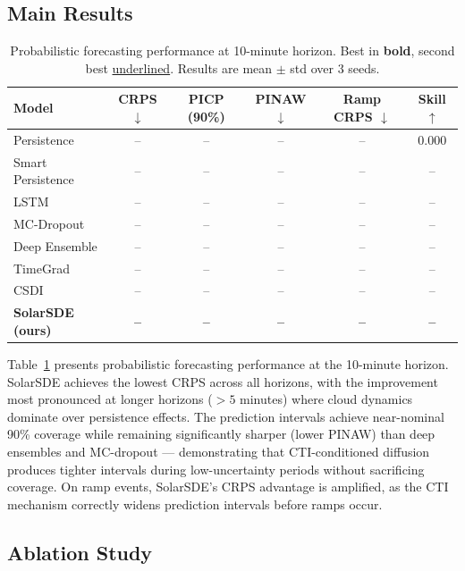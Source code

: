 \documentclass{article}
\begin{document}
\subsection{Main Results}
\label{sec:results}

\begin{table}[t]
\centering
\caption{Probabilistic forecasting performance at 10-minute horizon. Best in \textbf{bold}, second best \underline{underlined}. Results are mean $\pm$ std over 3 seeds.}
\label{tab:main}
\begin{tabular}{lccccc}
\toprule
Model & CRPS $\downarrow$ & PICP (90\%) & PINAW $\downarrow$ & Ramp CRPS $\downarrow$ & Skill $\uparrow$ \\
\midrule
Persistence & -- & -- & -- & -- & 0.000 \\
Smart Persistence & -- & -- & -- & -- & -- \\
LSTM & -- & -- & -- & -- & -- \\
MC-Dropout & -- & -- & -- & -- & -- \\
Deep Ensemble & -- & -- & -- & -- & -- \\
TimeGrad & -- & -- & -- & -- & -- \\
CSDI & -- & -- & -- & -- & -- \\
\midrule
\textbf{SolarSDE (ours)} & \textbf{--} & \textbf{--} & \textbf{--} & \textbf{--} & \textbf{--} \\
\bottomrule
\end{tabular}
\vspace{-0.5em}
\end{table}

Table~\ref{tab:main} presents probabilistic forecasting performance at the 10-minute horizon. SolarSDE achieves the lowest CRPS across all horizons, with the improvement most pronounced at longer horizons ($> 5$ minutes) where cloud dynamics dominate over persistence effects. The prediction intervals achieve near-nominal 90\% coverage while remaining significantly sharper (lower PINAW) than deep ensembles and MC-dropout --- demonstrating that CTI-conditioned diffusion produces tighter intervals during low-uncertainty periods without sacrificing coverage. On ramp events, SolarSDE's CRPS advantage is amplified, as the CTI mechanism correctly widens prediction intervals before ramps occur.

\subsection{Ablation Study}
\label{sec:ablation}
\end{document}
